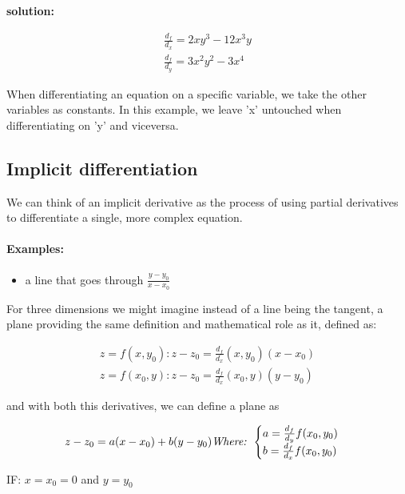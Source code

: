 \documentclass[11pt,fleqn]{book} %
\begin{document}
\textbf{solution:}

\begin{gather}
    \frac{d_f}{d_x} = 2xy^3 - 12x^3y \\
    \frac{d_f}{d_y} = 3x^2y^2 - 3x^4
\end{gather}

When differentiating an equation on a specific variable, we take the other variables as constants.
In this example, we leave 'x' untouched when differentiating on 'y' and viceversa.

\subsection{Implicit differentiation}

We can think of an implicit derivative as the process of using partial derivatives to 
differentiate a single, more complex equation. 

\paragraph{Examples: }

\begin{itemize}
    \item a line that goes through $ \frac{y - y_0}{x - x_0} $

\end{itemize}

For three dimensions we might imagine instead of a line being the tangent, a 
plane providing the same definition and mathematical role as it, defined as:

\begin{gather}
    z = f(x, y_0) : z - z_0 = \frac{d_f}{d_x}(x, y_0)(x-x_0) \\
    z = f(x_0, y) : z - z_0 = \frac{d_f}{d_x}(x_0, y)(y-y_0)
\end{gather}

and with both this derivatives, we can define a plane as 

\begin{equation}
    z - z_0 = a(x-x_0) + b (y-y_0) \text{\textit{Where: }} \begin{cases}
        a = \frac{d_f}{d_y}f(x_0, y_0)\\
        b = \frac{d_f}{d_x}f(x_0,y_0)
    \end{cases}
\end{equation}

IF: $ x = x_0 = 0 $ and $ y = y_0$
\end{document}
